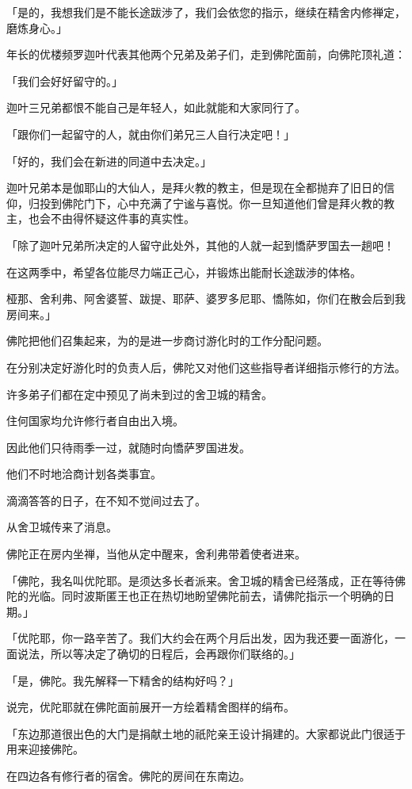 \documentclass[twoside,openany]{book}
\begin{document}
「是的，我想我们是不能长途跋渉了，我们会依您的指示，继续在精舍内修禅定，磨炼身心。」

年长的优楼频罗迦叶代表其他两个兄弟及弟子们，走到佛陀面前，向佛陀顶礼道：

「我们会好好留守的。」

迦叶三兄弟都恨不能自己是年轻人，如此就能和大家同行了。

「跟你们一起留守的人，就由你们弟兄三人自行决定吧！」

「好的，我们会在新进的同道中去决定。」

迦叶兄弟本是伽耶山的大仙人，是拜火教的教主，但是现在全都抛弃了旧日的信仰，归投到佛陀门下，心中充满了宁谧与喜悦。你一旦知道他们曾是拜火教的教主，也会不由得怀疑这件事的真实性。

「除了迦叶兄弟所决定的人留守此处外，其他的人就一起到憍萨罗国去一趟吧！

在这两季中，希望各位能尽力端正己心，并锻炼出能耐长途跋渉的体格。

桠那、舍利弗、阿舍婆誓、跋提、耶萨、婆罗多尼耶、憍陈如，你们在散会后到我房间来。」

佛陀把他们召集起来，为的是进一步商讨游化时的工作分配问题。

在分别决定好游化时的负责人后，佛陀又对他们这些指导者详细指示修行的方法。

许多弟子们都在定中预见了尚未到过的舍卫城的精舍。

住何国家均允许修行者自由出入境。

因此他们只待雨季一过，就随时向憍萨罗国进发。

他们不时地洽商计划各类事宜。

滴滴答答的日子，在不知不觉间过去了。

从舍卫城传来了消息。

佛陀正在房内坐禅，当他从定中醒来，舍利弗带着使者进来。

「佛陀，我名叫优陀耶。是须达多长者派来。舍卫城的精舍已经落成，正在等待佛陀的光临。同时波斯匿王也正在热切地盼望佛陀前去，请佛陀指示一个明确的日期。」

「优陀耶，你一路辛苦了。我们大约会在两个月后出发，因为我还要一面游化，一面说法，所以等决定了确切的日程后，会再跟你们联络的。」

「是，佛陀。我先解释一下精舍的结构好吗？」

说完，优陀耶就在佛陀面前展开一方绘着精舍图样的绢布。

「东边那道很出色的大门是捐献土地的祇陀亲王设计捐建的。大家都说此门很适于用来迎接佛陀。

在四边各有修行者的宿舍。佛陀的房间在东南边。
\end{document}
